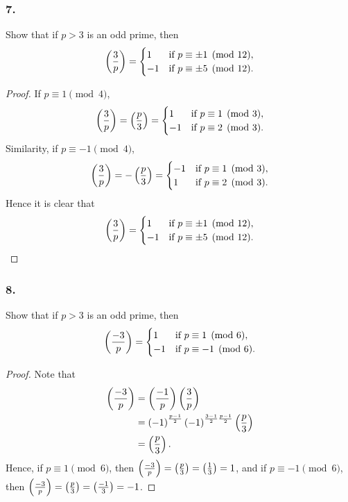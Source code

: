 \subsubsection{7.} Show that if $p>3$ is an odd prime, then
\[
    \left(\frac{3}{p}\right) = \begin{cases}
        1 & \mbox{if } p \equiv \pm 1 \pmod{12}, \\
        -1 & \mbox{if }p \equiv \pm 5 \pmod{12}.
    \end{cases}
\]
\begin{proof}
    If $p \equiv 1 \pmod{4}$,
    \[
        \left(\frac{3}{p}\right)=\left(\frac{p}{3}\right)=\begin{cases}
            1 & \mbox{if } p \equiv 1 \pmod{3}, \\
            -1 & \mbox{if } p \equiv 2 \pmod{3}. \\
        \end{cases}
    \]
    Similarity, if $p \equiv -1 \pmod{4}$,
    \[
        \left(\frac{3}{p}\right)=-\left(\frac{p}{3}\right)=\begin{cases}
            -1 & \mbox{if } p \equiv 1 \pmod{3}, \\
            1 & \mbox{if } p \equiv 2 \pmod{3}. \\
        \end{cases}
    \]
    Hence it is clear that
    \[
        \left(\frac{3}{p}\right) = \begin{cases}
            1 & \mbox{if } p \equiv \pm 1 \pmod{12}, \\
            -1 & \mbox{if }p \equiv \pm 5 \pmod{12}.
        \end{cases}
    \]
\end{proof}

\subsubsection{8.} Show that if $p>3$ is an odd prime, then
\[
    \left(\frac{-3}{p}\right) = \begin{cases}
        1 & \mbox{if } p \equiv 1 \pmod{6}, \\
        -1 & \mbox{if }p \equiv -1 \pmod{6}.
    \end{cases}
\]
\begin{proof}
    Note that
    \begin{align*}
        \left(\frac{-3}{p}\right) &= \left(\frac{-1}{p}\right)\left(\frac{3}{p}\right) \\
        &= \left(-1\right)^{\frac{p-1}{2}}\left(-1\right)^{\frac{3-1}{2}\frac{p-1}{2}}\left(\frac{p}{3}\right) \\
        &= \left(\frac{p}{3}\right).
    \end{align*}
    Hence, if $p \equiv 1 \pmod{6}$, then $\left(\frac{-3}{p}\right)=\left(\frac{p}{3}\right)=\left(\frac{1}{3}\right)=1$,
    and if $p \equiv -1 \pmod{6}$, then $\left(\frac{-3}{p}\right)=\left(\frac{p}{3}\right)=\left(\frac{-1}{3}\right)=-1$.
\end{proof}


